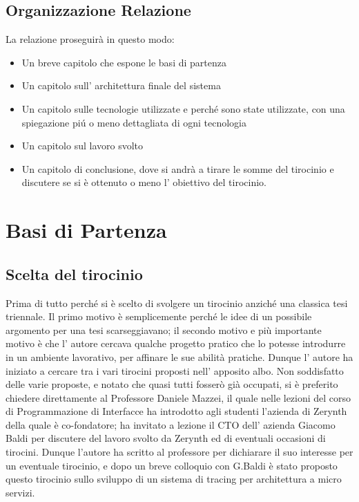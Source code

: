 \documentclass[a4paper,12pt,titlepage,italian,openany]{report}
\begin{document}
\section{Organizzazione Relazione}
La relazione proseguirà in questo modo:
\begin{itemize}
    \item Un breve capitolo che espone le basi di partenza
    \item Un capitolo sull' architettura finale del sistema
    \item Un capitolo sulle tecnologie utilizzate e perché sono state utilizzate, con una spiegazione piú o meno dettagliata di ogni tecnologia
    \item Un capitolo sul lavoro svolto 
    \item Un capitolo di conclusione, dove si andrà a tirare le somme del tirocinio e discutere se si è ottenuto o meno l' obiettivo del tirocinio.
\end{itemize}



\chapter{Basi di Partenza}
\section{Scelta del tirocinio}
Prima di tutto perché si è scelto di svolgere un tirocinio anziché una classica tesi triennale. Il primo motivo è semplicemente perché le idee di un possibile argomento
per una tesi scarseggiavano; il secondo motivo e più importante motivo è che l' autore cercava qualche progetto pratico che lo potesse introdurre in un ambiente lavorativo, per affinare le sue abilità pratiche. Dunque l' autore ha iniziato a cercare tra i vari tirocini proposti nell' apposito albo. Non soddisfatto delle varie proposte, e notato che quasi tutti fosserò già occupati, si è preferito chiedere direttamente al Professore Daniele Mazzei, il quale nelle lezioni del corso di Programmazione di Interfacce ha introdotto agli studenti l'azienda di Zerynth della quale è co-fondatore; ha invitato a lezione 
il CTO dell' azienda Giacomo Baldi per discutere del lavoro svolto da Zerynth ed di eventuali occasioni di tirocini. Dunque l'autore ha scritto al professore per dichiarare il suo interesse per un eventuale tirocinio, e dopo un breve colloquio con G.Baldi è stato proposto questo tirocinio sullo sviluppo di un sistema di tracing per architettura a micro servizi.
\end{document}
